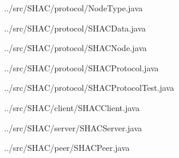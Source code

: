 \documentclass[11pt]{article}
\begin{document}
\begin{tiny}

\begin{lstinputlisting}[language=Java]{../src/SHAC/protocol/NodeType.java}
\end{lstinputlisting}
\begin{lstinputlisting}[language=Java]{../src/SHAC/protocol/SHACData.java}
\end{lstinputlisting}
\begin{lstinputlisting}[language=Java]{../src/SHAC/protocol/SHACNode.java}
\end{lstinputlisting}
\begin{lstinputlisting}[language=Java]{../src/SHAC/protocol/SHACProtocol.java}
\end{lstinputlisting}
\begin{lstinputlisting}[language=Java]{../src/SHAC/protocol/SHACProtocolTest.java}
\end{lstinputlisting}
\begin{lstinputlisting}[language=Java]{../src/SHAC/client/SHACClient.java}
\end{lstinputlisting}
\begin{lstinputlisting}[language=Java]{../src/SHAC/server/SHACServer.java}
\end{lstinputlisting}
\begin{lstinputlisting}[language=Java]{../src/SHAC/peer/SHACPeer.java}
\end{lstinputlisting}

\end{tiny}
\end{document}
